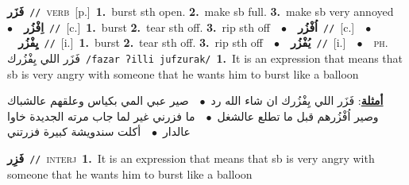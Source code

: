 \documentclass[10pt,a4paper,twoside]{article} %
\begin{document}
\begin{multicols}{2}
{\setlength\topsep{0pt}\textbf{\foreignlanguage{arabic}{فَزَر}}\ {\color{gray}\texttt{//}\color{black}}\ \textsc{verb}\ [p.]\ \textbf{1.}~burst sth open.  \textbf{2.}~make sb full.  \textbf{3.}~make sb very annoyed\ \ $\bullet$\ \ \setlength\topsep{0pt}\textbf{\foreignlanguage{arabic}{اِفْزُر}}\ {\color{gray}\texttt{//}\color{black}}\ [c.]\ \textbf{1.}~burst  \textbf{2.}~tear sth off.  \textbf{3.}~rip sth off\ \ $\bullet$\ \ \setlength\topsep{0pt}\textbf{\foreignlanguage{arabic}{اُفْزُر}}\ {\color{gray}\texttt{//}\color{black}}\ [c.]\ \ $\bullet$\ \ \setlength\topsep{0pt}\textbf{\foreignlanguage{arabic}{يِفْزُر}}\ {\color{gray}\texttt{//}\color{black}}\ [i.]\ \textbf{1.}~burst  \textbf{2.}~tear sth off.  \textbf{3.}~rip sth off\ \ $\bullet$\ \ \setlength\topsep{0pt}\textbf{\foreignlanguage{arabic}{يُفْزُر}}\ {\color{gray}\texttt{//}\color{black}}\ [i.]\ \ $\bullet$\ \ \textsc{ph.} \color{gray} \foreignlanguage{arabic}{فَزَر اللي يِفْزُرك}\color{black}\ {\color{gray}\texttt{/{\sffamily fazar ʔilli jufzurak}/}\color{black}}\ \textbf{1.}~It is an expression that means that sb is very angry with someone that he wants him to burst like a balloon\  \begin{flushright}\color{gray}\foreignlanguage{arabic}{\textbf{\underline{\foreignlanguage{arabic}{أمثلة}}}: فَزَر اللي يِفْزُرك ان شاء الله رد\ $\bullet$\ \  صير عبي المي بكياس وعلقهم عالشباك وصير اُفْزُرهم قبل ما تطلع عالشغل\ $\bullet$\ \  ما فزرني غير لما جاب مرته الجديدة خاوا عالدار\ $\bullet$\ \  أكلت سندويشة كبيرة فزرتني}\end{flushright}\color{black}} \vspace{2mm}

{\setlength\topsep{0pt}\textbf{\foreignlanguage{arabic}{فَزِر}}\ {\color{gray}\texttt{//}\color{black}}\ \textsc{interj}\ \textbf{1.}~It is an expression that means that sb is very angry with someone that he wants him to burst like a balloon\ } \vspace{2mm}


\end{multicols}
\end{document}

